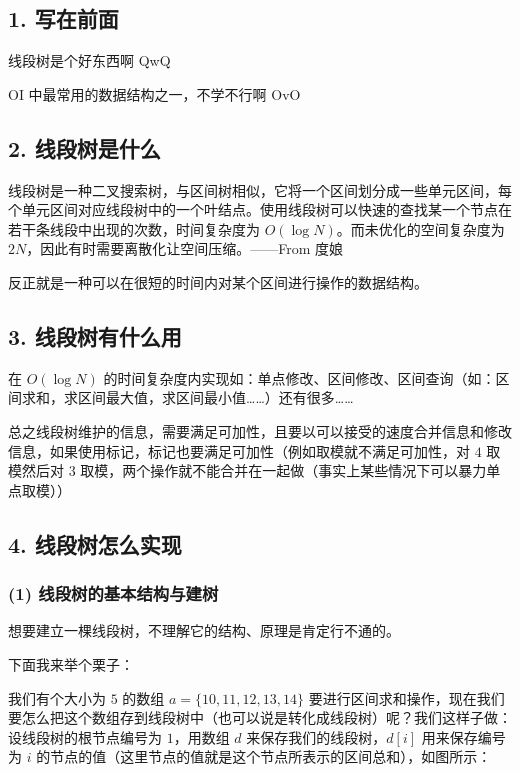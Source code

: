 
\subsection{1. 写在前面}

线段树是个好东西啊 QwQ

OI 中最常用的数据结构之一，不学不行啊 OvO

\subsection{2. 线段树是什么}

\begin{QUOTE}{}{}
线段树是一种二叉搜索树，与区间树相似，它将一个区间划分成一些单元区间，每个单元区间对应线段树中的一个叶结点。使用线段树可以快速的查找某一个节点在若干条线段中出现的次数，时间复杂度为 $O(\log N)$。而未优化的空间复杂度为 $2N$，因此有时需要离散化让空间压缩。——From 度娘
\end{QUOTE}

反正就是一种可以在很短的时间内对某个区间进行操作的数据结构。

\subsection{3. 线段树有什么用}

在 $O(\log N)$ 的时间复杂度内实现如：单点修改、区间修改、区间查询（如：区间求和，求区间最大值，求区间最小值……）还有很多……

总之线段树维护的信息，需要满足可加性，且要以可以接受的速度合并信息和修改信息，如果使用标记，标记也要满足可加性（例如取模就不满足可加性，对 $4$ 取模然后对 $3$ 取模，两个操作就不能合并在一起做（事实上某些情况下可以暴力单点取模））

\subsection{4. 线段树怎么实现}

\subsubsection{(1) 线段树的基本结构与建树}

想要建立一棵线段树，不理解它的结构、原理是肯定行不通的。

下面我来举个栗子：

我们有个大小为 $5$ 的数组 $a=\{10,11,12,13,14\}$ 要进行区间求和操作，现在我们要怎么把这个数组存到线段树中（也可以说是转化成线段树）呢？我们这样子做：设线段树的根节点编号为 $1$，用数组 $d$ 来保存我们的线段树，$d[i]$ 用来保存编号为 $i$ 的节点的值（这里节点的值就是这个节点所表示的区间总和），如图所示：

